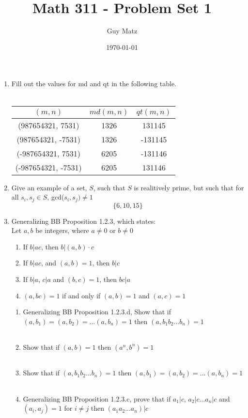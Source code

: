 \documentclass[11pt]{article}
\title{\textbf{Math 311 - Problem Set 1}}
\author{Guy Matz}
\date{\today}
\begin{document}


\begin{enumerate}  %
\item Fill out the values for md and qt in the following table.\\
\\
\begin{center}
  \begin{tabular}{ c | c | c }
    $(m,n)$ & $md(m,n)$ & $qt(m,n)$ \\ \hline
    (987654321, 7531) & 1326 & 131145 \\ \hline
    (987654321, -7531) & 1326 & -131145 \\ \hline
    (-987654321, 7531) & 6205 & -131146 \\ \hline
    (-987654321, -7531) & 6205 & 131146 \\ \hline
  \end{tabular}
\end{center}

\newpage %
\item Give an example of a set, $S$, such that $S$ is realitively prime, but such that for all $s_i, s_j \in S$, gcd($s_i, s_j) \neq 1$
$$\{6,10,15\}$$

\newpage %
\item Generalizing BB Proposition 1.2.3, which states: \\
Let $a, b$ be integers, where $a \neq 0$ or $b \neq 0$
\begin{enumerate}
\item If $b | ac$, then $b | (a,b) \cdot c$
\item If $b | ac$, and $(a, b) = 1$, then $b|c$
\item If $b | a$, $c | a$ and $(b, c) = 1$, then $bc|a$
\item $(a, bc) =1 $ if and only if $(a,b) = 1$ and $(a,c) = 1$
\end{enumerate}

\begin{enumerate}
\item Generalizing BB Proposition 1.2.3.d, Show that if $(a,b_1)=(a,b_2)=... (a,b_n)=1$ then $(a,b_1 b_2 ... b_n) = 1$\\
\\
\item Show that if $(a, b) = 1$ then $(a^n, b^n) = 1$\\
\\
\item Show that if $(a, b_1 b_2...b_n) = 1$ then $(a, b_1) = (a, b_2) = ... (a,b_n) = 1$\\
\\
\item Generalizing BB Proposition 1.2.3.c, prove that if $a_1 | c$, $a_2| c$...$a_n|c$ and $(a_i, a_j) = 1$ for $i \neq j$ then $(a_1 a_2...a_n)|c$


\end{enumerate}
\end{enumerate}
\end{document}
